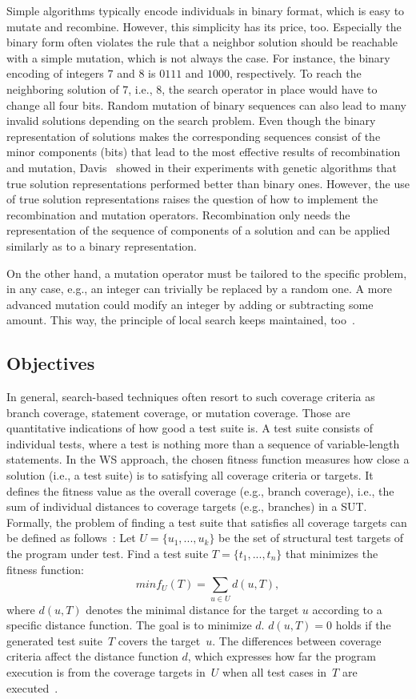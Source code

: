 \documentclass[paper=a4,%
  twoside,%
  BCOR4mm,%
  abstract=true,%
  toc=bibliography,%
  chapterprefix=true,%
  toc=bibliographynumbered,%
  open=right,%
  english,%
  pagesize=pdftex]{scrreprt}
\newcommand{\sut}{\ac{SUT}\xspace}
\begin{document}
Simple algorithms typically encode individuals in binary format, which is easy to mutate and recombine. However, this simplicity has its price, too. Especially the binary form often violates the rule that a neighbor solution should be reachable with a simple mutation, which is not always the case. For instance, the binary encoding of integers $7$ and $8$ is $0111$ and $1000$, respectively. To reach the neighboring solution of $7$, i.e., $8$, the search operator in place would have to change all four bits. Random mutation of binary sequences can also lead to many invalid solutions depending on the search problem. Even though the binary representation of solutions makes the corresponding sequences consist of the minor components (bits) that lead to the most effective results of recombination and mutation, Davis~\cite{Davis1991} showed in their experiments with genetic algorithms that true solution representations performed better than binary ones. However, the use of true solution representations raises the question of how to implement the recombination and mutation operators. Recombination only needs the representation of the sequence of components of a solution and can be applied similarly as to a binary representation. 

On the other hand, a mutation operator must be tailored to the specific problem, in any case, e.g., an integer can trivially be replaced by a random one. A more advanced mutation could modify an integer by adding or subtracting some amount. This way, the principle of local search keeps maintained, too~\cite{Davis1991}.


\subsection{Objectives}
In general, search-based techniques often resort to such coverage criteria as branch coverage, statement coverage, or mutation coverage. Those are quantitative indications of how good a test suite is. A test suite consists of individual tests, where a test is nothing more than a sequence of variable-length statements. In the \ac{WS} approach, the chosen fitness function measures how close a solution (i.e., a test suite) is to satisfying all coverage criteria or targets. It defines the fitness value as the overall coverage (e.g., branch coverage), i.e., the sum of individual distances to coverage targets (e.g., branches) in a \sut. Formally, the problem of finding a test suite that satisfies all coverage targets can be defined as follows~\cite{Panichella2018}: Let $U = \{u_1, ..., u_k\}$ be the set of structural test targets of the program under test. Find a test suite $T = \{t_1, ..., t_n\}$ that minimizes the fitness function:
\begin{equation}
minf_U(T) = \sum_{u \in U}{d(u, T)},
\end{equation}
where $d(u, T)$ denotes the minimal distance for the target $u$ according to a specific distance function. The goal is to minimize $d$. $d(u, T) = 0$ holds if the generated test suite~$T$ covers the target~$u$. The differences between coverage criteria affect the distance function $d$, which expresses how far the program execution is from the coverage targets in~$U$ when all test cases in~$T$ are executed~\cite{Panichella2018}.
\end{document}
